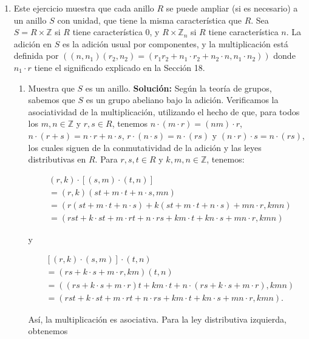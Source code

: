 \begin{enumerate}
	\item Este ejercicio muestra que cada anillo $R$ se puede ampliar (si es necesario) a un anillo $S$ con unidad, que tiene la misma característica que $R$. Sea $S = R \times \mathbb{Z}$ si $R$ tiene característica 0, y $R \times \mathbb{Z}_n$ si $R$ tiene característica $n$. La adición en $S$ es la adición usual por componentes, y la multiplicación está definida por $((n, n_1)(r_2, n_2) = (r_1r_2 + n_1 \cdot r_2 + n_2 \cdot n, n_1 \cdot n_2))$ donde $n_1 \cdot r$ tiene el significado explicado en la Sección 18.
	\begin{enumerate}
		\item Muestra que $S$ es un anillo.
		\textbf{Solución:}
		 Según la teoría de grupos, sabemos que \(S\) es un grupo abeliano bajo la adición. Verificamos la asociatividad de la multiplicación, utilizando el hecho de que, para todos los \(m, n \in \mathbb{Z}\) y \(r, s \in R\), tenemos \(n \cdot (m \cdot r) = (nm) \cdot r\), \(n \cdot (r+s) = n \cdot r + n \cdot s\), \(r \cdot (n \cdot s) = n \cdot (rs)\) y \((n \cdot r) \cdot s = n \cdot (rs)\), los cuales siguen de la conmutatividad de la adición y las leyes distributivas en \(R\). Para \(r, s, t \in R\) y \(k, m, n \in \mathbb{Z}\), tenemos:
		
		\begin{align*}
			&(r, k) \cdot [(s, m) \cdot (t, n)] \\
			&= (r, k)(st + m \cdot t + n \cdot s, mn) \\
			&= \left(r(st + m \cdot t + n \cdot s) + k(st + m \cdot t + n \cdot s) + mn \cdot r, kmn\right) \\
			&= \left(rst + k \cdot st + m \cdot rt + n \cdot rs + km \cdot t + kn \cdot s + mn \cdot r, kmn\right)
		\end{align*}
		
		y
		
		\begin{align*}
			&[(r, k) \cdot (s, m)] \cdot (t, n) \\
			&= (rs + k \cdot s + m \cdot r, km)(t, n) \\
			&= \left((rs + k \cdot s + m \cdot r)t + km \cdot t + n \cdot (rs + k \cdot s + m \cdot r), kmn\right) \\
			&= \left(rst + k \cdot st + m \cdot rt + n \cdot rs + km \cdot t + kn \cdot s + mn \cdot r, kmn\right).
		\end{align*}
		
		Así, la multiplicación es asociativa. Para la ley distributiva izquierda, obtenemos
		

\end{enumerate}
\end{enumerate}
